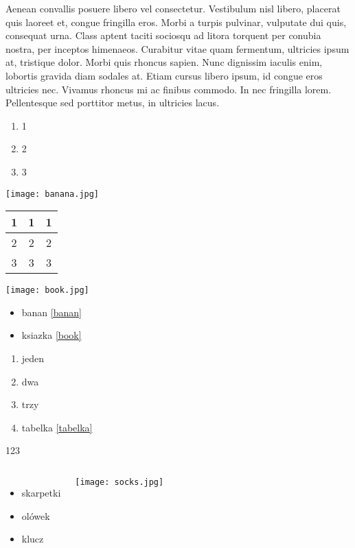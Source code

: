 \documentclass{beamer}
\begin{document}
Aenean convallis posuere libero vel consectetur. Vestibulum nisl libero, placerat quis laoreet et, congue fringilla eros. Morbi a turpis pulvinar, vulputate dui quis, consequat urna. Class aptent taciti sociosqu ad litora torquent per conubia nostra, per inceptos himenaeos. Curabitur vitae quam fermentum, ultricies ipsum at, tristique dolor. Morbi quis rhoncus sapien. Nunc dignissim iaculis enim, lobortis gravida diam sodales at. Etiam cursus libero ipsum, id congue eros ultricies nec. Vivamus rhoncus mi ac finibus commodo. In nec fringilla lorem. Pellentesque sed porttitor metus, in ultricies lacus.

\begin{enumerate}
    \item 1
    \item 2
    \item 3
\end{enumerate}
\texttt{[image: banana.jpg]}
\label{banan}
\newpage
\begin{table}
			\hfill
		\begin{tabular}{|c||c||c|}
			\hline
			1 & 1 & 1 \\ 
			\hline
			2 & 2 & 2\\ 
			\hline
			3 & 3 & 3\\ 
			\hline
		\end{tabular}
		\end{table}
  \label{tabelka}
\label{book}
  \newpage
\texttt{[image: book.jpg]}
\begin{itemize}
    \item banan \ref{banan}
    \item ksiazka \ref{book}
\end{itemize}
\newpage
\begin{enumerate}
    \item jeden
    \item dwa
    \item trzy
    \item tabelka \ref{tabelka}
\end{enumerate}

\begin{frame}{123}
\begin{columns}[T]
	\begin{itemize}
		\item skarpetki
		\item olówek
		\item klucz
	\end{itemize}
	
	\hspace*{-8cm}
	\texttt{[image: socks.jpg]}
 \label{skarpetki}


 
\end{columns}
\end{frame}
\end{document}
